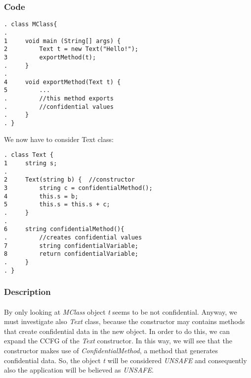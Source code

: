 \documentclass[letterpaper,twocolumn,10pt]{article}
\begin{document}
\subsubsection{Code}

\begin{verbatim}
. class MClass{
.
1     void main (String[] args) {	    
2         Text t = new Text("Hello!");
3         exportMethod(t);
.     }
.
4     void exportMethod(Text t) {        
5         ...
.         //this method exports 
.         //confidential values
.     }
. }
\end{verbatim}

\noindent We now have to consider Text class:
\begin{verbatim}
. class Text {
1     string s;
.	
2     Text(string b) { 	//constructor
3         string c = confidentialMethod();
4         this.s = b;
5         this.s = this.s + c;
.     }
.	
6     string confidentialMethod(){ 
.         //creates confidential values
7         string confidentialVariable;		
8         return confidentialVariable;
.     }
. }
\end{verbatim}

%
%	
%

\subsubsection{Description}
\paragraph{}
By only looking at \emph{MClass} object \emph{t} seems to be not confidential. Anyway, we must investigate also \emph{Text} class, because the constructor may contains methods that create confidential data in the new object. In order to do this, we can expand the CCFG of the \emph{Text} constructor. In this way, we will see that the constructor makes use of \emph{ConfidentialMethod}, a method that generates confidential data. So, the object \emph{t} will be considered \emph{UNSAFE} and consequently also the application will be believed as \emph{UNSAFE}.
\end{document}

